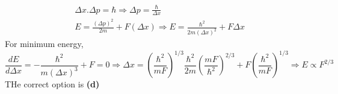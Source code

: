 \begin{enumerate}
\begin{answer}
		\begin{align*}
		&\Delta x . \Delta p=\hbar \Rightarrow \Delta p=\frac{\hbar}{\Delta x} \\
		&E=\frac{(\Delta p)^{2}}{2 m}+F(\Delta x) \Rightarrow E=\frac{\hbar^{2}}{2 m(\Delta x)^{2}}+F \Delta x
		\end{align*}
		For minimum energy,
		$$
		\frac{d E}{d \Delta x}=-\frac{\hbar^{2}}{m(\Delta x)^{3}}+F=0 \Rightarrow \Delta x=\left(\frac{\hbar^{2}}{m F}\right)^{1 / 3} \frac{\hbar^{2}}{2 m}\left(\frac{m F}{\hbar^{2}}\right)^{2 / 3}+F\left(\frac{\hbar^{2}}{m F}\right)^{1 / 3} \Rightarrow E \propto F^{2 / 3}
		$$ THe correct option is \textbf{(d)}
	\end{answer}
\end{enumerate}